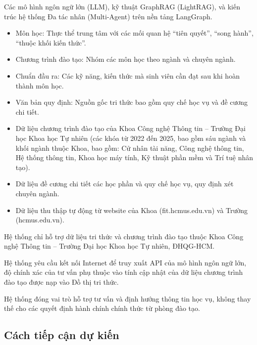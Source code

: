 \begin{refsection}
 Các mô hình ngôn ngữ lớn (LLM), kỹ thuật GraphRAG (LightRAG), và kiến trúc hệ thống Đa tác nhân (Multi-Agent) trên nền tảng LangGraph.

\medskip
{}
\begin{itemize}[label={--}, leftmargin=1.5em]
    \item Môn học: Thực thể trung tâm với các mối quan hệ ``tiên quyết'', ``song hành'', ``thuộc khối kiến thức''.
    \item Chương trình đào tạo: Nhóm các môn học theo ngành và chuyên ngành.
    \item Chuẩn đầu ra: Các kỹ năng, kiến thức mà sinh viên cần đạt sau khi hoàn thành môn học.
    \item Văn bản quy định: Nguồn gốc tri thức bao gồm quy chế học vụ và đề cương chi tiết.
\end{itemize}

\medskip
{}
\begin{itemize}[label={--}, leftmargin=1.5em]
    \item Dữ liệu chương trình đào tạo của Khoa Công nghệ Thông tin -- Trường Đại học Khoa học Tự nhiên (các khóa từ 2022 đến 2025, bao gồm sáu ngành và khối ngành thuộc Khoa, bao gồm: Cử nhân tài năng, Công nghệ thông tin, Hệ thống thông tin, Khoa học máy tính, Kỹ thuật phần mềm và Trí tuệ nhân tạo).
    \item Dữ liệu đề cương chi tiết các học phần và quy chế học vụ, quy định xét chuyên ngành.
    \item Dữ liệu thu thập tự động từ website của Khoa (fit.hcmus.edu.vn) và Trường (hcmus.edu.vn).
\end{itemize}

\medskip
{} Hệ thống chỉ hỗ trợ dữ liệu tri thức và chương trình đào tạo thuộc Khoa Công nghệ Thông tin -- Trường Đại học Khoa học Tự nhiên, ĐHQG-HCM.

\medskip
{} Hệ thống yêu cầu kết nối Internet để truy xuất API của mô hình ngôn ngữ lớn, độ chính xác của tư vấn phụ thuộc vào tính cập nhật của dữ liệu chương trình đào tạo được nạp vào Đồ thị tri thức.

\medskip
{} Hệ thống đóng vai trò hỗ trợ tư vấn và định hướng thông tin học vụ, không thay thế cho các quyết định hành chính chính thức từ phòng đào tạo.

\subsection*{\thepropsubsec\quad Cách tiếp cận dự kiến}


\end{refsection}
